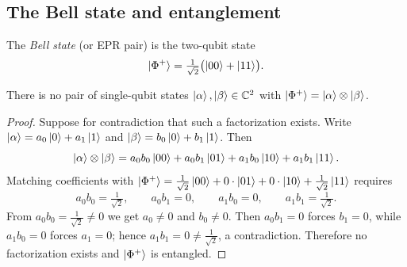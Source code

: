 \begin{center}
\end{center}

\subsection{The Bell state and entanglement}
\label{sec:lec01-bell-sub}

\begin{definition}\label{def:lec01-bell}
The \emph{Bell state} (or EPR pair) is the two-qubit state
\begin{equation}
  \ket{\Phi^{+}}=\tfrac{1}{\sqrt2}\bigl(\ket{00}+\ket{11}\bigr).
\end{equation}
\end{definition}

\begin{theorem}\label{thm:lec01-bell}
There is no pair of single-qubit states $\ket{\alpha},\ket{\beta}\in\mathbb{C}^{2}$ with
$\ket{\Phi^{+}}=\ket{\alpha}\otimes\ket{\beta}$.
\end{theorem}

\begin{proof}
Suppose for contradiction that such a factorization exists. Write
$\ket{\alpha}=a_0\ket{0}+a_1\ket{1}$ and $\ket{\beta}=b_0\ket{0}+b_1\ket{1}$. Then
\[
  \ket{\alpha}\otimes\ket{\beta}
    =a_0 b_0\ket{00}+a_0 b_1\ket{01}+a_1 b_0\ket{10}+a_1 b_1\ket{11}.
\]
Matching coefficients with
$\ket{\Phi^{+}}=\tfrac{1}{\sqrt2}\ket{00}+0\cdot\ket{01}+0\cdot\ket{10}+\tfrac{1}{\sqrt2}\ket{11}$
requires
\[
  a_0 b_0=\tfrac{1}{\sqrt2},\qquad a_0 b_1=0,\qquad a_1 b_0=0,\qquad a_1 b_1=\tfrac{1}{\sqrt2}.
\]
From $a_0 b_0=\tfrac{1}{\sqrt2}\neq0$ we get $a_0\neq0$ and $b_0\neq0$. Then
$a_0 b_1=0$ forces $b_1=0$, while $a_1 b_0=0$ forces $a_1=0$; hence
$a_1 b_1=0\neq\tfrac{1}{\sqrt2}$, a contradiction. Therefore no factorization exists
and $\ket{\Phi^{+}}$ is entangled.
\end{proof}

